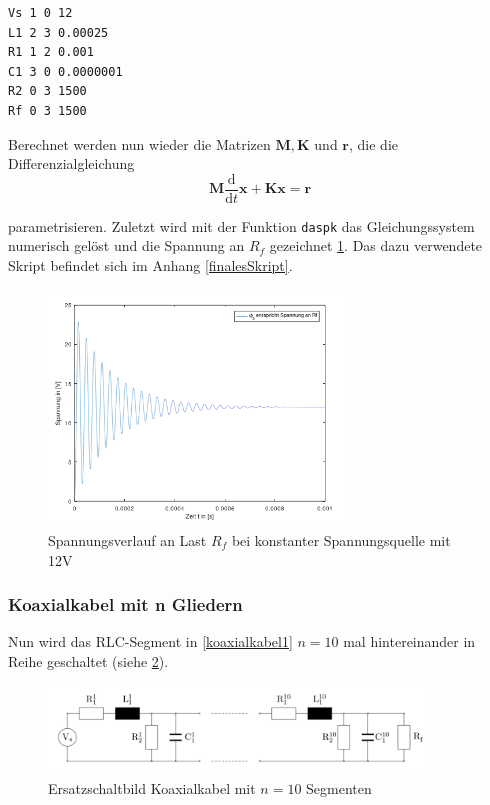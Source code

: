 \begin{lstlisting}[caption={Netzliste Koaxialkabel}, label=netlist1]
Vs 1 0 12
L1 2 3 0.00025
R1 1 2 0.001
C1 3 0 0.0000001
R2 0 3 1500
Rf 0 3 1500
\end{lstlisting}

Berechnet werden nun wieder die Matrizen $\mathbf{M, K}$ und $\mathbf{r}$, die die Differenzialgleichung
\begin{equation}
\mathbf{M} \frac{\text{d}}{\text{d}t} \mathbf{x} + \mathbf{K} \mathbf{x} = \mathbf{r}
\label{matrixDGL}
\end{equation}

parametrisieren. Zuletzt wird mit der Funktion \texttt{daspk} das Gleichungssystem numerisch gelöst und die Spannung an $R_f$ gezeichnet \ref{plottKK1}. Das dazu verwendete Skript befindet sich im Anhang \ref{finalesSkript}.

\begin{figure}[h]
	\centering
	\includegraphics[width=0.7\textwidth]{data/plotKK1}
	\caption{Spannungsverlauf an Last $R_f$ bei konstanter Spannungsquelle mit 12\si{\volt}}
	\label{plottKK1}
\end{figure}

\subsubsection{Koaxialkabel mit n Gliedern}
Nun wird das RLC-Segment in \ref{koaxialkabel1} $n=10$ mal hintereinander in Reihe geschaltet (siehe \ref{koaxialkabel10}).

\begin{figure}[h]
	\centering
	\includegraphics[width= 0.9\textwidth]{data/Koaxialkabel10}
	\caption{Ersatzschaltbild Koaxialkabel mit $n=10$ Segmenten}
	\label{koaxialkabel10}
\end{figure}

